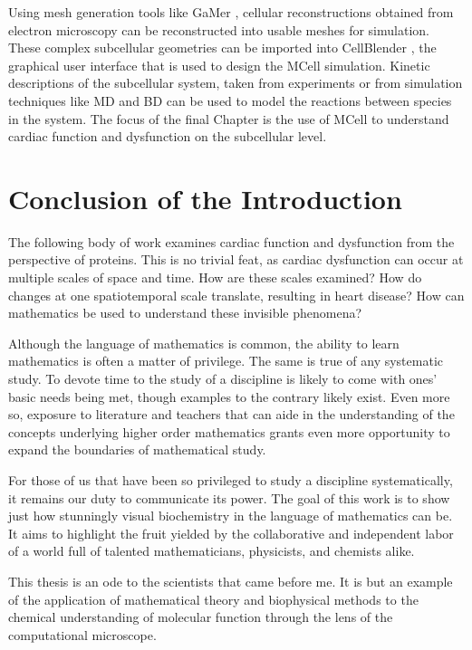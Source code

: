 \documentclass[12pt]{ucsddissertation}
\begin{document}
\begin{dissertationintroduction}
Using mesh generation tools like GaMer \cite{Yu2008, Lee2018}, cellular reconstructions obtained from electron microscopy can be reconstructed into usable meshes for simulation. These complex subcellular geometries can be imported into CellBlender \cite{Gupta2018}, the graphical user interface that is used to design the MCell simulation. Kinetic descriptions of the subcellular system, taken from experiments or from simulation techniques like MD and BD can be used to model the reactions between species in the system. The focus of the final Chapter is the use of MCell to understand cardiac function and dysfunction on the subcellular level. 

\section{Conclusion of the Introduction}
The following body of work examines cardiac function and dysfunction from the perspective of proteins. This is no trivial feat, as cardiac dysfunction can occur at multiple scales of space and time. How are these scales examined? How do changes at one spatiotemporal scale translate, resulting in heart disease? How can mathematics be used to understand these invisible phenomena?

Although the language of mathematics is common, the ability to learn mathematics is often a matter of privilege. The same is true of any systematic study. To devote time to the study of a discipline is likely to come with ones' basic needs being met, though examples to the contrary likely exist. Even more so, exposure to literature and teachers that can aide in the understanding of the concepts underlying higher order mathematics grants even more opportunity to expand the boundaries of mathematical study.

For those of us that have been so privileged to study a discipline systematically, it remains our duty to communicate its power. The goal of this work is to show just how stunningly visual biochemistry in the language of mathematics can be. It aims to highlight the fruit yielded by the collaborative and independent labor of a world full of talented mathematicians, physicists, and chemists alike. 

This thesis is an ode to the scientists that came before me. It is but an example of the application of mathematical theory and biophysical methods to the chemical understanding of molecular function through the lens of the computational microscope. 
 

 
 
\end{dissertationintroduction}
\end{document}
